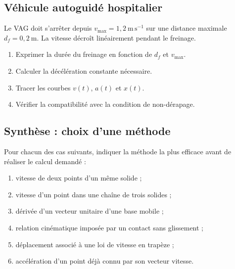 \subsection{Véhicule autoguidé hospitalier}

Le VAG doit s'arrêter depuis $v_{\max}=1{,}2\ \mathrm{m\,s^{-1}}$ sur
une distance maximale $d_f=0{,}2\ \mathrm m$. La vitesse décroît
linéairement pendant le freinage.

\begin{center}
\hfill
{}
\end{center}

\begin{enumerate}
  \item Exprimer la durée du freinage en fonction de $d_f$ et $v_{\max}$.
  \item Calculer la décélération constante nécessaire.
  \item Tracer les courbes $v(t)$, $a(t)$ et $x(t)$.
  \item Vérifier la compatibilité avec la condition de non-dérapage.
\end{enumerate}

\subsection{Synthèse : choix d'une méthode}

Pour chacun des cas suivants, indiquer la méthode la plus efficace avant
de réaliser le calcul demandé :
\begin{enumerate}
  \item vitesse de deux points d'un même solide ;
  \item vitesse d'un point dans une chaîne de trois solides ;
  \item dérivée d'un vecteur unitaire d'une base mobile ;
  \item relation cinématique imposée par un contact sans glissement ;
  \item déplacement associé à une loi de vitesse en trapèze ;
  \item accélération d'un point déjà connu par son vecteur vitesse.
\end{enumerate}
